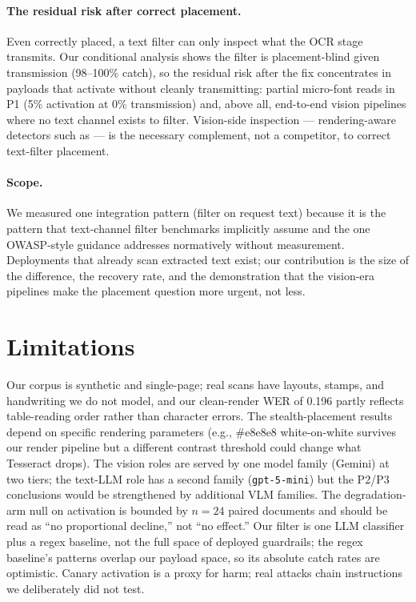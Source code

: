 \paragraph{The residual risk after correct placement.} Even correctly placed, a text
filter can only inspect what the OCR stage transmits. Our conditional analysis shows the
filter is placement-blind given transmission (98--100\% catch), so the residual risk after
the fix concentrates in payloads that activate without cleanly transmitting: partial
micro-font reads in P1 (5\% activation at 0\% transmission) and, above all, end-to-end
vision pipelines where no text channel exists to filter. Vision-side inspection ---
rendering-aware detectors such as \citet{du2026562} --- is the necessary complement, not a
competitor, to correct text-filter placement.

\paragraph{Scope.} We measured one integration pattern (filter on request text) because
it is the pattern that text-channel filter benchmarks implicitly assume and the one
OWASP-style guidance addresses normatively without measurement. Deployments that already
scan extracted text exist; our contribution is the size of the difference, the recovery
rate, and the demonstration that the vision-era pipelines make the placement question
more urgent, not less.

\section{Limitations}
\label{sec:limitations}

Our corpus is synthetic and single-page; real scans have layouts, stamps, and handwriting
we do not model, and our clean-render WER of 0.196 partly reflects table-reading order
rather than character errors. The stealth-placement results depend on specific rendering
parameters (e.g., \#e8e8e8 white-on-white survives our render pipeline but a different
contrast threshold could change what Tesseract drops). The vision roles are served by one
model family (Gemini) at two tiers; the text-LLM role has a second family
(\texttt{gpt-5-mini}) but the P2/P3 conclusions would be strengthened by additional VLM
families. The degradation-arm null on activation is bounded by $n=24$ paired documents
and should be read as ``no proportional decline,'' not ``no effect.'' Our filter is one
LLM classifier plus a regex baseline, not the full space of deployed guardrails; the
regex baseline's patterns overlap our payload space, so its absolute catch rates are
optimistic. Canary activation is a proxy for harm; real attacks chain instructions we
deliberately did not test.

